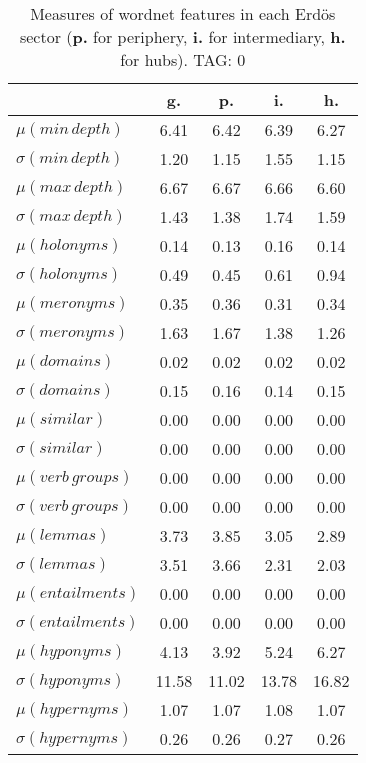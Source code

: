 \begin{table}[h!]
\begin{center}
\begin{tabular}{| l | c | c | c | c |}\hline
 & g. & p. & i. & h. \\\hline
$\mu(min\,depth)$ & 6.41  & 6.42  & 6.39  & 6.27 \\\hline
$\sigma(min\,depth)$ & 1.20  & 1.15  & 1.55  & 1.15 \\\hline
$\mu(max\,depth)$ & 6.67  & 6.67  & 6.66  & 6.60 \\\hline
$\sigma(max\,depth)$ & 1.43  & 1.38  & 1.74  & 1.59 \\\hline
$\mu(holonyms)$ & 0.14  & 0.13  & 0.16  & 0.14 \\\hline
$\sigma(holonyms)$ & 0.49  & 0.45  & 0.61  & 0.94 \\\hline
$\mu(meronyms)$ & 0.35  & 0.36  & 0.31  & 0.34 \\\hline
$\sigma(meronyms)$ & 1.63  & 1.67  & 1.38  & 1.26 \\\hline
$\mu(domains)$ & 0.02  & 0.02  & 0.02  & 0.02 \\\hline
$\sigma(domains)$ & 0.15  & 0.16  & 0.14  & 0.15 \\\hline
$\mu(similar)$ & 0.00  & 0.00  & 0.00  & 0.00 \\\hline
$\sigma(similar)$ & 0.00  & 0.00  & 0.00  & 0.00 \\\hline
$\mu(verb\,groups)$ & 0.00  & 0.00  & 0.00  & 0.00 \\\hline
$\sigma(verb\,groups)$ & 0.00  & 0.00  & 0.00  & 0.00 \\\hline
$\mu(lemmas)$ & 3.73  & 3.85  & 3.05  & 2.89 \\\hline
$\sigma(lemmas)$ & 3.51  & 3.66  & 2.31  & 2.03 \\\hline
$\mu(entailments)$ & 0.00  & 0.00  & 0.00  & 0.00 \\\hline
$\sigma(entailments)$ & 0.00  & 0.00  & 0.00  & 0.00 \\\hline
$\mu(hyponyms)$ & 4.13  & 3.92  & 5.24  & 6.27 \\\hline
$\sigma(hyponyms)$ & 11.58  & 11.02  & 13.78  & 16.82 \\\hline
$\mu(hypernyms)$ & 1.07  & 1.07  & 1.08  & 1.07 \\\hline
$\sigma(hypernyms)$ & 0.26  & 0.26  & 0.27  & 0.26 \\\hline
\end{tabular}
\caption{Measures of wordnet features in each Erd\"os sector ({{\bf p.}} for periphery, {{\bf i.}} for intermediary, {{\bf h.}} for hubs). TAG: 0}
\end{center}
\end{table}